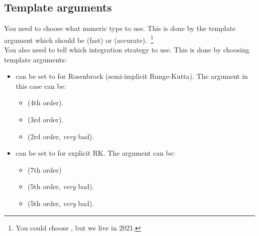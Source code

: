 \documentclass[10pt,utf8,compress,xcolor=dvipsnames]{beamer}
\begin{document}
\subsection{Template arguments}
\begin{frame}[fragile]{\insertsubsectionhead}
	You need to choose what numeric type to use. This is done by the template argument  which should be  (fast) or  (accurate).~\footnote{\fontF You could choose , but we live in 2021.}\\[0.5cm]
	
	
	You also need to tell \mimes which integration strategy to use. This is done by choosing template arguments:
	\begin{itemize}
		\item {} can be set to  for Rosenbrock (semi-implicit Runge-Kutta). 
		The  argument in this case can be:\\[-0.0cm]
		\begin{itemize}
			\item {} (4th order).
			\item {} (3rd order).
			\item {} (2rd order, {\em very} bad).
		\end{itemize}
		\item {} can be set to  for explicit RK.
		The  argument can be:\\[-0.0cm]
		\begin{itemize}
			\item {} (7th order)
			\item {} (5th order, {\em very} bad).
			\item {} (5th order, {\em very} bad).
		\end{itemize}	
	\end{itemize}
\end{frame}
\end{document}
